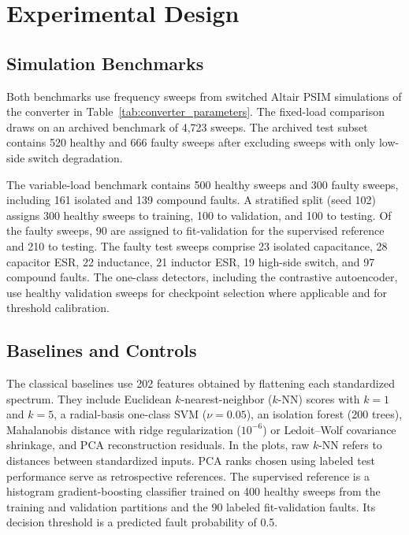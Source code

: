 \documentclass[journal]{IEEEtran}
\begin{document}
\section{Experimental Design}\label{sec:5}

\subsection{Simulation Benchmarks}\label{sec:5_1}

Both benchmarks use frequency sweeps from switched Altair PSIM simulations of the converter in Table~\ref{tab:converter_parameters}. The fixed-load comparison draws on an archived benchmark of 4,723 sweeps. The archived test subset contains 520 healthy and 666 faulty sweeps after excluding sweeps with only low-side switch degradation.

The variable-load benchmark contains 500 healthy sweeps and 300 faulty sweeps, including 161 isolated and 139 compound faults. A stratified split (seed 102) assigns 300 healthy sweeps to training, 100 to validation, and 100 to testing. Of the faulty sweeps, 90 are assigned to fit-validation for the supervised reference and 210 to testing. The faulty test sweeps comprise 23 isolated capacitance, 28 capacitor ESR, 22 inductance, 21 inductor ESR, 19 high-side switch, and 97 compound faults. The one-class detectors, including the contrastive autoencoder, use healthy validation sweeps for checkpoint selection where applicable and for threshold calibration.

\subsection{Baselines and Controls}\label{sec:5_2}

The classical baselines use 202 features obtained by flattening each standardized spectrum. They include Euclidean $k$-nearest-neighbor ($k$-NN) scores with $k=1$ and $k=5$, a radial-basis one-class SVM ($\nu=0.05$), an isolation forest (200 trees), Mahalanobis distance with ridge regularization ($10^{-6}$) or Ledoit--Wolf covariance shrinkage, and PCA reconstruction residuals. In the plots, raw $k$-NN refers to distances between standardized inputs. PCA ranks chosen using labeled test performance serve as retrospective references. The supervised reference is a histogram gradient-boosting classifier trained on 400 healthy sweeps from the training and validation partitions and the 90 labeled fit-validation faults. Its decision threshold is a predicted fault probability of 0.5.
\end{document}
